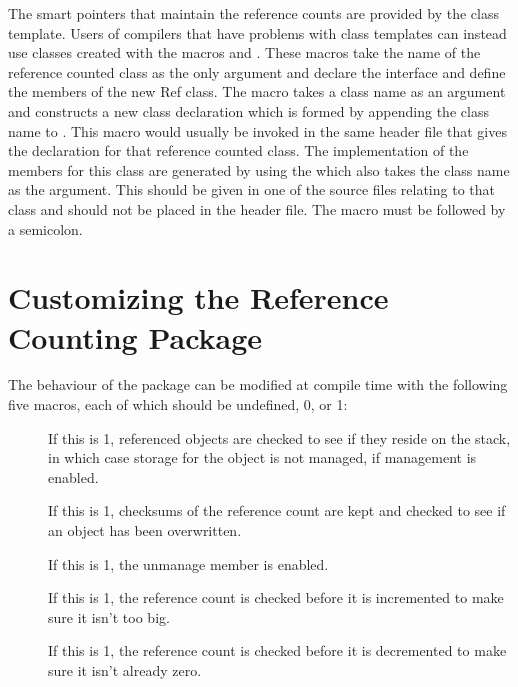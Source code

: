 The smart pointers that maintain the reference counts are
provided by the  class template.  Users of
compilers that have problems with class templates can instead
use classes created with the  macros  and
.  These macros take the name of the reference counted
class as the only argument and declare the interface
and define the members of the new Ref class.
The  macro takes a class name as an argument and
constructs a new class declaration which is formed by appending the
class name to .  This macro would usually be invoked in the
same header file that gives the declaration for that reference counted
class.  The implementation of the members for this class are generated
by using the  which also takes the class name as the
argument.  This should be given in one of the source files relating to
that class and should not be placed in the header file.  The
 macro must be followed by a semicolon.







\section{Customizing the Reference Counting Package}

  The behaviour of the package can be modified at compile time
with the following five macros, each of which should be undefined, 0, or 1:

\begin{description}
\item[]
  If this is 1, referenced objects are checked to see if they
  reside on the stack, in which case storage for the object is not managed,
  if management is enabled.
\item[]
  If this is 1, checksums of the reference count are kept
  and checked to see if an object has been overwritten.
\item[]
  If this is 1, the unmanage member is enabled.
\item[]
  If this is 1, the reference count is checked before
  it is incremented to make sure it isn't too big.
\item[]
  If this is 1, the reference count is checked before
  it is decremented to make sure it isn't already zero.
\end{description}

